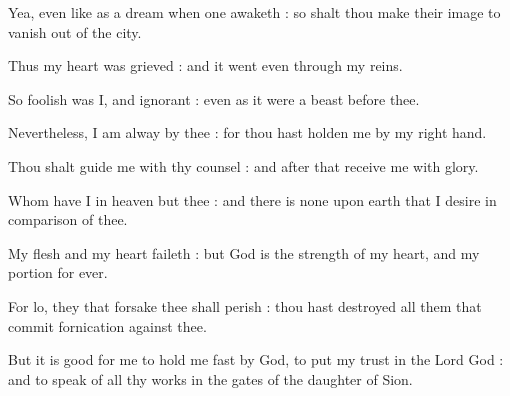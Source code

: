 Yea, even like as a dream when one awaketh : so shalt thou make their image to vanish out of the city.\par
{}Thus my heart was grieved : and it went even through my reins.\par
{}So foolish was I, and ignorant : even as it were a beast before thee.\par
{}Nevertheless, I am alway by thee : for thou hast holden me by my right hand.\par
{}Thou shalt guide me with thy counsel : and after that receive me with glory.\par
{}Whom have I in heaven but thee : and there is none upon earth that I desire in comparison of thee.\par
{}My flesh and my heart faileth : but God is the strength of my heart, and my portion for ever.\par
{}For lo, they that forsake thee shall perish : thou hast destroyed all them that commit fornication against thee.\par
{}But it is good for me to hold me fast by God, to put my trust in the Lord God : and to speak of all thy works in the gates of the daughter of Sion.\par


